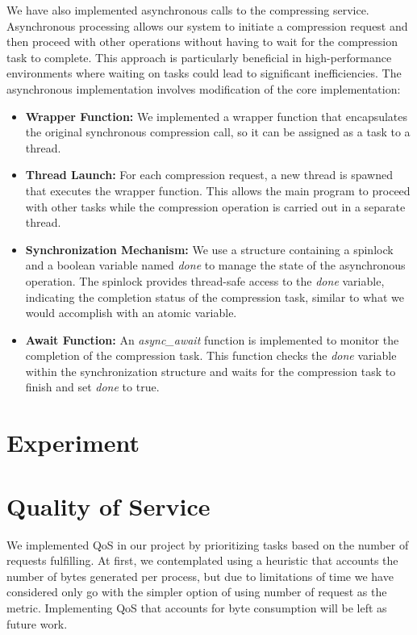 \documentclass[12pt]{article}
\begin{document}
We have also implemented asynchronous calls to the compressing service. Asynchronous processing allows our system to initiate a compression request and then proceed with other operations without having to wait for the compression task to complete. This approach is particularly beneficial in high-performance environments where waiting on tasks could lead to significant inefficiencies. The asynchronous implementation involves modification of the core implementation:

\begin{itemize}
    \item \textbf{Wrapper Function:} We implemented a wrapper function that encapsulates the original synchronous compression call, so it can be assigned as a task to a thread.
    
    \item \textbf{Thread Launch:} For each compression request, a new thread is spawned that executes the wrapper function. This allows the main program to proceed with other tasks while the compression operation is carried out in a separate thread.
    
    \item \textbf{Synchronization Mechanism:} We use a structure containing a spinlock and a boolean variable named \textit{done} to manage the state of the asynchronous operation. The spinlock provides thread-safe access to the \textit{done} variable, indicating the completion status of the compression task, similar to what we would accomplish with an atomic variable.
    
    \item \textbf{Await Function:} An \textit{async\_await} function is implemented to monitor the completion of the compression task. This function checks the \textit{done} variable within the synchronization structure and waits for the compression task to finish and set \textit{done} to true.
\end{itemize}

\section*{Experiment}



\section*{Quality of Service}
\par We implemented QoS in our project by prioritizing tasks based on the number of requests fulfilling. At first, we contemplated using a heuristic that accounts the number of bytes generated per process, but due to limitations of time we have considered only go with the simpler option of using number of request as the metric. Implementing QoS that accounts for byte consumption will be left as future work.
\end{document}
